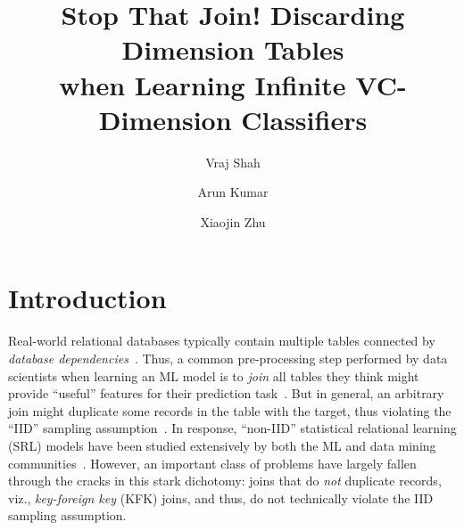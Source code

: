 \documentclass[sigconf]{acmart}
\begin{document}
\title{Stop That Join! Discarding Dimension Tables \\when Learning Infinite VC-Dimension Classifiers}

\author{Vraj Shah}
\author{Arun Kumar}
\author{Xiaojin Zhu}

\begin{abstract}

\end{abstract}


\maketitle

\section{Introduction}

Real-world relational databases typically contain multiple tables connected by \textit{database dependencies}~\cite{cowbook}. Thus, a common pre-processing step 
performed by data scientists when learning an ML model is to \textit{join} all tables they think might provide ``useful'' features for their prediction 
task~\cite{crossmine,orion,rendle,hamlet,olteanuf}.
But in general, an arbitrary join might duplicate some records in the table with the target, thus violating the ``IID'' sampling assumption~\cite{hastie}. 
In response, ``non-IID'' statistical relational learning (SRL) models have been studied extensively by both the ML and data mining communities~\cite{getoor}. 
However, an important class of problems have largely fallen through the cracks in this stark dichotomy: 
joins that do \textit{not} duplicate records, viz., \textit{key-foreign key} (KFK) joins, and thus, do not technically violate the IID sampling assumption.
\end{document}
